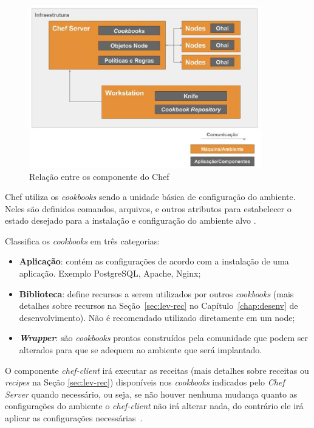 \begin{figure}[H]
  \centering
  \caption{Relação entre os componente do Chef}
  \label{fig:chef-comp}
  \includegraphics[width=0.9\textwidth]{figuras/chef-comp.eps}
\end{figure}

Chef utiliza os \textit{cookbooks} sendo a unidade básica de configuração do
ambiente. Neles são definidos comandos, arquivos, e outros atributos
para estabelecer o estado desejado para a instalação e configuração
do ambiente alvo \cite{sharma:2015}.

 Classifica os \textit{cookbooks} em três categorias:
\begin{itemize}
  \item \textbf{Aplicação}: contém as configurações de acordo com a instalação de
    uma aplicação. Exemplo PostgreSQL, Apache, Nginx;
  \item \textbf{Biblioteca}: define recursos a serem utilizados por outros \textit{cookbooks}
    (mais detalhes sobre recursos na Seção~\ref{sec:lev-rec} no Capítulo~\ref{chap:desenv} de desenvolvimento).
    Não é recomendado utilizado diretamente em um node;
  \item \textbf{\textit{Wrapper}}: são \textit{cookbooks} prontos construídos pela comunidade que podem
    ser alterados para que se adequem ao ambiente que será implantado.
\end{itemize}

O componente \textit{chef-client} irá executar as receitas (mais detalhes sobre receitas ou
\textit{recipes} na Seção \ref{sec:lev-rec}) disponíveis nos \textit{cookbooks}
indicados pelo \textit{Chef Server} quando necessário, ou seja, se não houver
nenhuma mudança quanto as configurações do ambiente o \textit{chef-client} não irá
alterar nada, do contrário ele irá aplicar as configurações necessárias~\cite{chefdoc:2016}.





